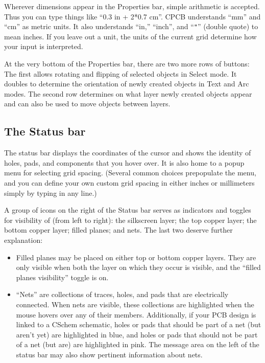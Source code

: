 \documentclass[11pt]{report}
\begin{document}
%
Wherever dimensions appear in the Properties bar, simple arithmetic is
accepted. Thus you can type things like ``0.3 in + 2*0.7 cm''. CPCB
understands ``mm'' and ``cm'' as metric units. It also understands
``in,'' ``inch'', and ``{\tt "}'' (double quote) to mean inches. If
you leave out a unit, the units of the current grid determine how your
input is interpreted.

At the very bottom of the Properties bar, there are two more rows of
buttons: The first allows rotating and flipping of selected objects in
Select mode. It doubles to determine the orientation of newly created
objects in Text and Arc modes. The second row determines on what layer
newly created objects appear and can also be used to move objects
between layers.

\subsection{The Status bar}
The status bar displays the coordinates of the cursor and shows the
identity of holes, pads, and components that you hover over. It is
also home to a popup menu for selecting grid spacing. (Several common
choices prepopulate the menu, and you can define your own custom grid
spacing in either inches or millimeters simply by typing in any line.)

A group of icons on the right of the Status bar serves as indicators
and toggles for visibility of (from left to right): the silkscreen
layer; the top copper layer; the bottom copper layer; filled planes;
and nets.  The last two deserve further explanation:
\begin{itemize}
  \item Filled planes may be placed on
either top or bottom copper layers. They are only visible when both
the layer on which they occur is visible, and the ``filled planes
visibility'' toggle is on.
\item ``Nets'' are collections of traces, holes, and pads that are
  electrically connected. When nets are visible, these collections are
  highlighted when the mouse hovers over any of their
  members. Additionally, if your PCB design is linked to a CSchem
  schematic, holes or pads that should be part of a net (but
  aren't yet) are highlighted in blue, and holes or pads that should
  not be part of a net (but are) are highlighted in pink. The message
  area on the left of the status bar may also show pertinent
  information about nets.
\end{itemize}
\end{document}
